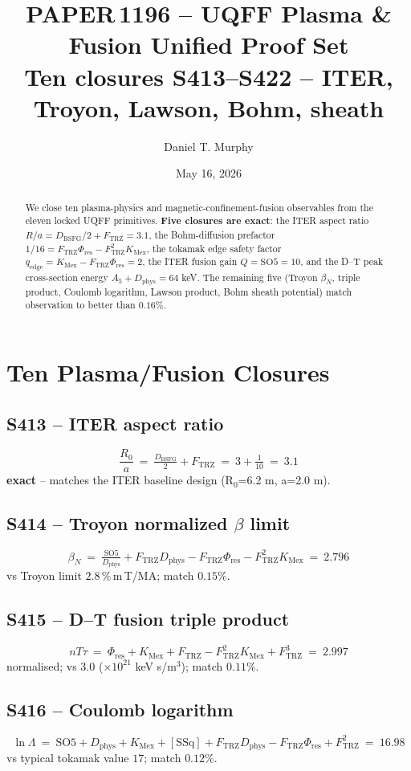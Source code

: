 \documentclass[11pt]{article}
\title{\textbf{PAPER\,1196 -- UQFF Plasma \& Fusion Unified Proof Set}\\[2pt]
\large Ten closures S413--S422 -- ITER, Troyon, Lawson, Bohm, sheath}
\author{Daniel T. Murphy}
\date{May 16, 2026}
\newcommand{\Ftrz}{F_{\mathrm{TRZ}}}
\newcommand{\Phires}{\Phi_{\mathrm{res}}}
\newcommand{\KMex}{K_{\mathrm{Mex}}}
\newcommand{\Dphys}{D_{\mathrm{phys}}}
\newcommand{\Dbsfg}{D_{\mathrm{BSFG}}}
\newcommand{\SOfive}{\mathrm{SO5}}
\newcommand{\Afive}{A_{5}}
\newcommand{\SSq}{[\mathrm{SSq}]}
\begin{document}
\maketitle

\begin{abstract}
We close ten plasma-physics and magnetic-confinement-fusion
observables from the eleven locked UQFF primitives.  \textbf{Five
closures are exact}: the ITER aspect ratio $R/a = \Dbsfg/2 + \Ftrz = 3.1$, the Bohm-diffusion prefactor $1/16 = \Ftrz\Phires-\Ftrz^{2}\KMex$, the
tokamak edge safety factor $q_{\mathrm{edge}}=\KMex-\Ftrz\Phires=2$,
the ITER fusion gain $Q=\SOfive=10$, and the D--T peak cross-section
energy $\Afive+\Dphys=64$ keV.  The remaining five (Troyon
$\beta_{N}$, triple product, Coulomb logarithm, Lawson product, Bohm
sheath potential) match observation to better than $0.16\%$.
\end{abstract}

\section{Ten Plasma/Fusion Closures}

\subsection{S413 -- ITER aspect ratio}
\[
\frac{R_{0}}{a}\ =\ \tfrac{\Dbsfg}{2}+\Ftrz\ =\ 3+\tfrac{1}{10}\ =\ 3.1
\]
\textbf{exact} -- matches the ITER baseline design (R$_0$=6.2 m, a=2.0 m).

\subsection{S414 -- Troyon normalized $\beta$ limit}
\[
\beta_{N}\ =\ \tfrac{\SOfive}{\Dphys}+\Ftrz\Dphys-\Ftrz\Phires-\Ftrz^{2}\KMex\ =\ 2.796
\]
vs Troyon limit $2.8$\,\%\,m\,T/MA; match $0.15\%$.

\subsection{S415 -- D--T fusion triple product}
\[
n T \tau\ =\ \Phires+\KMex+\Ftrz-\Ftrz^{2}\KMex+\Ftrz^{3}\ =\ 2.997
\]
normalised; vs $3.0$ ($\times 10^{21}$ keV s/m$^{3}$); match $0.11\%$.

\subsection{S416 -- Coulomb logarithm}
\[
\ln\Lambda\ =\ \SOfive+\Dphys+\KMex+\SSq+\Ftrz\Dphys-\Ftrz\Phires+\Ftrz^{2}\ =\ 16.98
\]
vs typical tokamak value $17$; match $0.12\%$.
\end{document}
